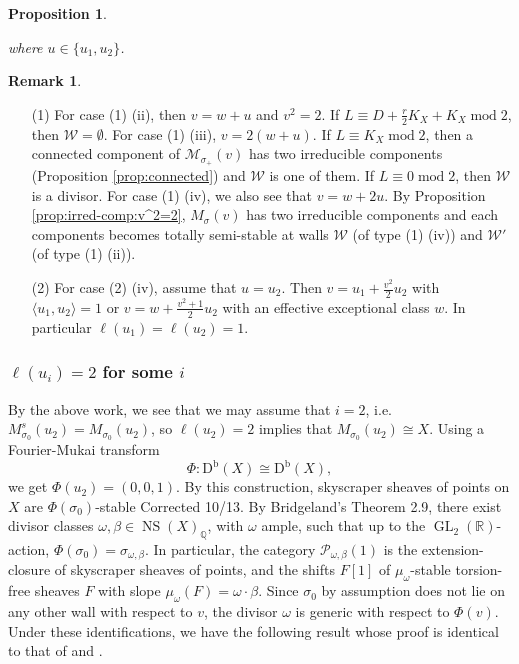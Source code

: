 \documentclass[leqno,11pt]{amsart}
\def\Q{\ensuremath{\mathbb{Q}}}
\def\R{\ensuremath{\mathbb{R}}}
\def\GL{\mathop{\mathrm{GL}}}
\def\mod{\mathop{\mathrm{mod}}\nolimits}
\def\NS{\mathop{\mathrm{NS}}\nolimits}
\def\Db{\mathrm{D}^{\mathrm{b}}}
\newtheorem{Prop}[Thm]{Proposition}
\theoremstyle{definition}
\newtheorem{Rem}[Thm]{Remark}
\def\Q{\ensuremath{\mathbb{Q}}}
\def\R{\ensuremath{\mathbb{R}}}
\def\MM{\ensuremath{\mathcal M}}
\def\PP{\ensuremath{\mathcal P}}
\def\WW{\ensuremath{\mathcal W}}
\begin{document}
{\begin{Prop}
\begin{enumerate}
\begin{enumerate}
where $u \in \{u_1,u_2 \}$.  
\end{enumerate}
\end{enumerate}
\end{Prop}
\begin{Rem}
\begin{enumerate}
\item[(1)]
For case (1) (ii), then
$v=w+u$ and $v^2=2$.
If $L \equiv D+\frac{r}{2}K_X+K_X \mod 2$, then $\WW=\emptyset$.
For case (1) (iii),
$v=2(w+u)$. If $L \equiv K_X \mod 2$, then
a connected component of $\MM_{\sigma_+}(v)$ has two irreducible
components (Proposition \ref{prop:connected}) and $\WW$ is one of them.
If $L \equiv 0 \mod 2$, then 
$\WW$ is a divisor.
For case (1) (iv),
we also see that
$v=w+2u$. By Proposition \ref{prop:irred-comp:v^2=2},
$M_\sigma (v)$ has two irreducible components and
each components becomes totally semi-stable at walls
$\WW$ (of type (1) (iv)) and $\WW'$ (of type (1) (ii)).
\item[(2)]
For case (2) (iv),
assume that $u=u_2$. Then
$v=u_1+\frac{v^2}{2} u_2$ with $\langle u_1,u_2 \rangle=1$ or
$v=w+\frac{v^2+1}{2}u_2$ with an effective exceptional class $w$.
In particular $\ell(u_1)=\ell(u_2)=1$.
\end{enumerate}
\end{Rem}
}

\subsubsection{$\ell(u_i)=2$ for some $i$}
By the above work, we see that we may assume that $i=2$, i.e. $M_{\sigma_0}^s(u_2)=M_{\sigma_0}(u_2)$, so $\ell(u_2)=2$ implies that $M_{\sigma_0}(u_2)\cong X$.  Using a Fourier-Mukai transform $$\Phi:\Db(X)\cong\Db(X),$$ we get $\Phi(u_2)=(0,0,1)$.  By this construction, skyscraper sheaves of points on $X$ are $\Phi(\sigma_0)$-stable{\color{red} Corrected 10/13}. By Bridgeland's Theorem 2.9, there exist divisor classes $\omega,\beta\in\NS(X)_{\Q}$, with $\omega$ ample, such that up to the $\GL_2(\R)$-action, $\Phi(\sigma_0)=\sigma_{\omega,\beta}$. In particular, the category $\PP_{\omega,\beta}(1)$ is the extension-closure of skyscraper sheaves of points, and the shifts $F[1]$ of $\mu_{\omega}$-stable torsion-free sheaves $F$ with slope $\mu_{\omega}(F) =\omega\cdot\beta$. Since $\sigma_0$ by assumption does not lie on any other wall with respect to $v$, the divisor $\omega$ is generic with respect to  $\Phi(v)$. Under these identifications, we have the following result whose proof is identical to that of \cite[Theorem 1.2]{MYY14} and \cite[Proposition 8.2]{BM14b}.
\end{document}
